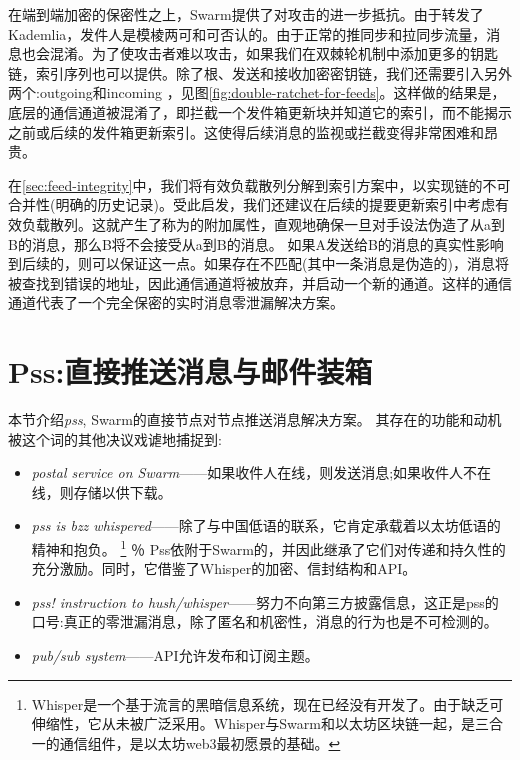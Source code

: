 在端到端加密的保密性之上，Swarm提供了对攻击的进一步抵抗。由于转发了Kademlia，发件人是模棱两可和可否认的。由于正常的推同步和拉同步流量，消息也会混淆。为了使攻击者难以攻击，如果我们在双棘轮机制中添加更多的钥匙链，索引序列也可以提供。除了根、发送和接收加密密钥链，我们还需要引入另外两个:outgoing和incoming ，见图\ref{fig:double-ratchet-for-feeds}。这样做的结果是，底层的通信通道被混淆了，即拦截一个发件箱更新块并知道它的索引，而不能揭示之前或后续的发件箱更新索引。这使得后续消息的监视或拦截变得非常困难和昂贵。

在\ref{sec:feed-integrity}中，我们将有效负载散列分解到索引方案中，以实现链的不可合并性(明确的历史记录)。受此启发，我们还建议在后续的提要更新索引中考虑有效负载散列。这就产生了称为的附加属性，直观地确保一旦对手设法伪造了从a到B的消息，那么B将不会接受从a到B的消息。
如果A发送给B的消息的真实性影响到后续的，则可以保证这一点。如果存在不匹配(其中一条消息是伪造的)，消息将被查找到错误的地址，因此通信通道将被放弃，并启动一个新的通道。这样的通信通道代表了一个完全保密的实时消息零泄漏解决方案。




\section{Pss:直接推送消息与邮件装箱\statusgreen}\label{sec:pss}

\green{}

本节介绍\emph{pss}, Swarm的直接节点对节点推送消息解决方案。
其存在的功能和动机被这个词的其他决议戏谑地捕捉到:

\begin{itemize}
\item \emph{postal service on Swarm}——如果收件人在线，则发送消息;如果收件人不在线，则存储以供下载。
\item \emph{pss is bzz whispered}——除了与中国低语的联系，它肯定承载着以太坊低语的精神和抱负。%
%
\footnote{Whisper是一个基于流言的黑暗信息系统，现在已经没有开发了。由于缺乏可伸缩性，它从未被广泛采用。Whisper与Swarm和以太坊区块链一起，是三合一的通信组件，是以太坊web3最初愿景的基础。}
％
Pss依附于Swarm的，并因此继承了它们对传递和持久性的充分激励。同时，它借鉴了Whisper的加密、信封结构和API。
\item \emph{pss! instruction to hush/whisper}——努力不向第三方披露信息，这正是pss的口号:真正的零泄漏消息，除了匿名和机密性，消息的行为也是不可检测的。
\item  \emph{pub/sub system}——API允许发布和订阅主题。
\end{itemize}

